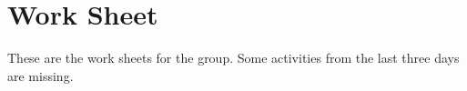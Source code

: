 
\chapter{Work Sheet}
\label{chap:WorkSheet}

These are the work sheets for the group. Some activities from the last three days are missing.

